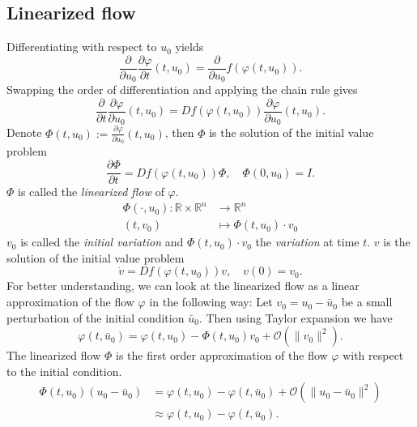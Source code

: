 \documentclass[11pt,a4paper]{article}
\begin{document}
\subsection{Linearized flow}
Differentiating with respect to $u_0$ yields
\begin{equation*}
     \frac{\partial}{\partial u_0} \frac{\partial \varphi}{\partial t}(t,u_0) = \frac{\partial}{\partial u_0} f(\varphi(t,u_0)).
\end{equation*}
Swapping the order of differentiation and applying the chain rule gives
\begin{equation*}
    \frac{\partial}{\partial t} \frac{\partial \varphi}{\partial u_0}(t,u_0) = Df(\varphi(t,u_0))\frac{\partial \varphi}{\partial u_0}(t,u_0).
\end{equation*}
Denote $\Phi(t,u_0) := \frac{\partial \varphi}{\partial u_0}(t,u_0)$, then $\Phi$ is the solution of the initial value problem
\begin{equation}\label{eq:lin_flow}
    \frac{\partial \Phi}{\partial t} = Df(\varphi(t,u_0))\Phi, \quad \Phi(0,u_0) = I.
\end{equation}
$\Phi$ is called the \textit{linearized flow} of $\varphi$. \begin{align*}
    \Phi(\cdot,u_0):\mathbb{R}\times \mathbb{R}^n &\to \mathbb{R}^{n} \\
    (t,v_0) &\mapsto \Phi(t,u_0)\cdot v_0
\end{align*}
$v_0$ is called the \textit{initial variation} and $\Phi(t,u_0)\cdot v_0$ the \textit{variation} at time $t$. $v$ is the solution of the initial value problem
\begin{equation}\label{eq:lin_var}
    \dot{v} = Df(\varphi(t,u_0))v, \quad v(0) = v_0.
\end{equation}
For better understanding, we can look at the linearized flow as a linear approximation of the flow $\varphi$ in the following way: Let $v_0=u_0-\bar{u}_0$ be a small perturbation of the initial condition $\bar{u}_0$. Then using Taylor expansion we have
\begin{equation*}
    \varphi(t,\bar{u}_0) = \varphi(t,u_0) - \Phi(t,u_0)v_0 + \mathcal{O}(\|v_0\|^2).
\end{equation*}
The linearized flow $\Phi$ is the first order approximation of the flow $\varphi$ with respect to the initial condition.
\begin{align*}
    \Phi(t,u_0)(u_0-\bar{u}_0) &= \varphi(t,u_0) - \varphi(t,\bar{u}_0) + \mathcal{O}(\|u_0-\bar{u}_0\|^2)\\
    &\approx \varphi(t,u_0) - \varphi(t,\bar{u}_0).
\end{align*}
\end{document}
